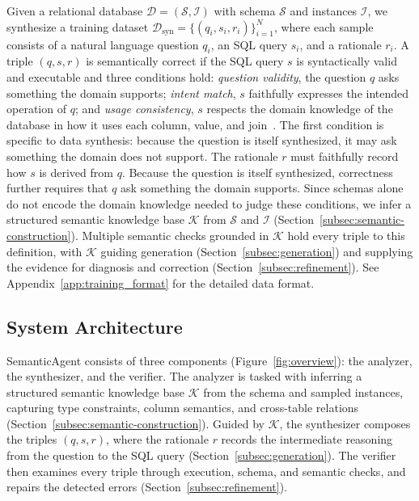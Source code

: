 \documentclass[letterpaper,journal]{IEEEtran}
\begin{document}
Given a relational database $\mathcal{D} = (\mathcal{S}, \mathcal{I})$ with schema $\mathcal{S}$ and instances $\mathcal{I}$, we synthesize a training dataset $\mathcal{D}_{\text{syn}} = \{(q_i, s_i, r_i)\}_{i=1}^{N}$, where each sample consists of a natural language question $q_i$, an SQL query $s_i$, and a rationale $r_i$. A triple $(q, s, r)$ is semantically correct if the SQL query $s$ is syntactically valid and executable and three conditions hold: \emph{question validity}, the question $q$ asks something the domain supports; \emph{intent match}, $s$ faithfully expresses the intended operation of $q$; and \emph{usage consistency}, $s$ respects the domain knowledge of the database in how it uses each column, value, and join~\cite{liu2025nl2sqlbugs}. The first condition is specific to data synthesis: because the question is itself synthesized, it may ask something the domain does not support. The rationale $r$ must faithfully record how $s$ is derived from $q$. Because the question is itself synthesized, correctness further requires that $q$ ask something the domain supports. Since schemas alone do not encode the domain knowledge needed to judge these conditions, we infer a structured semantic knowledge base $\mathcal{K}$ from $\mathcal{S}$ and $\mathcal{I}$ (Section~\ref{subsec:semantic-construction}). Multiple semantic checks grounded in $\mathcal{K}$ hold every triple to this definition, with $\mathcal{K}$ guiding generation (Section~\ref{subsec:generation}) and supplying the evidence for diagnosis and correction (Section~\ref{subsec:refinement}). See Appendix~\ref{app:training_format} for the detailed data format.


\subsection{System Architecture}
\label{subsec:architecture}

SemanticAgent consists of three components (Figure~\ref{fig:overview}): the analyzer, the synthesizer, and the verifier. The analyzer is tasked with inferring a structured semantic knowledge base $\mathcal{K}$ from the schema and sampled instances, capturing type constraints, column semantics, and cross-table relations (Section~\ref{subsec:semantic-construction}). Guided by $\mathcal{K}$, the synthesizer composes the triples $(q, s, r)$, where the rationale $r$ records the intermediate reasoning from the question to the SQL query (Section~\ref{subsec:generation}). The verifier then examines every triple through execution, schema, and semantic checks, and repairs the detected errors (Section~\ref{subsec:refinement}).
\end{document}
